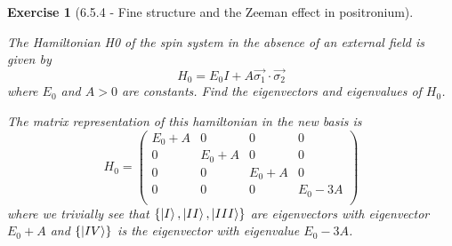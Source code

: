 \documentclass[12pt]{article}
\def\be{\begin{equation}}
\def\ee{\end{equation}}
\newtheorem{exercise}{Exercise}
\begin{document}
\begin{exercise}[6.5.4 - Fine structure and the Zeeman effect in positronium]
\begin{exercises}
			\item The Hamiltonian H0 of the spin system in the absence of an external field is given by
			\be
				H_0 = E_0I + A \vec{\sigma_1}\cdot\vec{\sigma_2}
			\ee
			where $E_0$ and $A>0$ are constants. Find the eigenvectors and eigenvalues of $H_0$.
			\begin{multianswer}
				The matrix representation of this hamiltonian in the new basis is
				\be
					H_0 = 
					\begin{pmatrix}
						E_0+A & 0 & 0 & 0 \\
						0 & E_0+A & 0 & 0 \\
						0 & 0 & E_0+A & 0 \\
						0 & 0 & 0 & E_0-3A \\
					\end{pmatrix}
				\ee
				where we trivially see that $\{ \ket{I}, \ket{II}, \ket{III} \}$ are eigenvectors with eigenvector $E_0+A$ and $\{\ket{IV}\}$ is the eigenvector with eigenvalue $E_0-3A$. 
			\end{multianswer}
			

\end{exercises}
\end{exercise}
\end{document}
